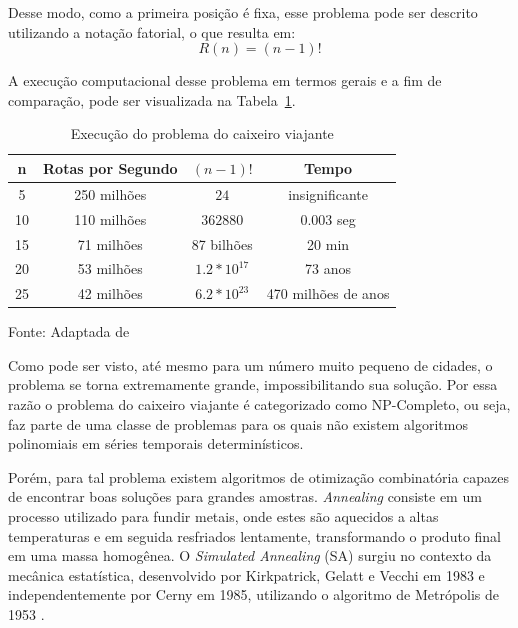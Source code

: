 \documentclass[journal, a4paper]{IEEEtran}
\begin{document}
    Desse modo, como a primeira posição é fixa, esse problema pode ser descrito utilizando a notação fatorial, o que resulta em:
    \begin{equation}
		R(n) = (n - 1)!
	\end{equation}

	A execução computacional desse problema em termos gerais e a fim de comparação, pode ser visualizada na Tabela~\ref{tab:execucao}.

    \begin{table}[!hbt]
		\begin{center}
		\caption{Execução do problema do caixeiro viajante}
		\label{tab:execucao}
		\begin{tabular}{|c|c|c|c|}
			\hline
            \textbf{n}  & \textbf{Rotas por Segundo} & \textbf{$(n-1)!$} & \textbf{Tempo} \\
			\hline
			5  & 250 milhões & $24$ & insignificante \\
			\hline
			10 & 110 milhões & $362880$ & 0.003 seg \\
			\hline
			15 & 71 milhões & 87 bilhões & 20 min \\
			\hline
			20 & 53 milhões & $1.2*10^{17}$ & 73 anos \\
			\hline
			25 & 42 milhões & $6.2*10^{23}$ & 470 milhões de anos \\
            \hline
		\end{tabular}
        \begin{tablenotes}
            Fonte: Adaptada de \cite{portocv}
        \end{tablenotes}
		\end{center}
	\end{table}

	Como pode ser visto, até mesmo para um número muito pequeno de cidades, o problema se torna extremamente grande, impossibilitando sua solução. Por essa razão o problema do caixeiro viajante é categorizado como NP-Completo, ou seja, faz parte de uma classe de problemas para os quais não existem algoritmos polinomiais em séries temporais determinísticos.

    Porém, para tal problema existem algoritmos de otimização combinatória capazes de encontrar boas soluções para grandes amostras. \textit{Annealing} consiste em um processo utilizado para fundir metais, onde estes são aquecidos a altas temperaturas e em seguida resfriados lentamente, transformando o produto final em uma massa homogênea. O \textit{Simulated Annealing} (SA) surgiu no contexto da mecânica estatística, desenvolvido por Kirkpatrick, Gelatt e Vecchi em 1983 e independentemente por Cerny em 1985, utilizando o algoritmo de Metrópolis de 1953 \cite{haeser}.
\end{document}
